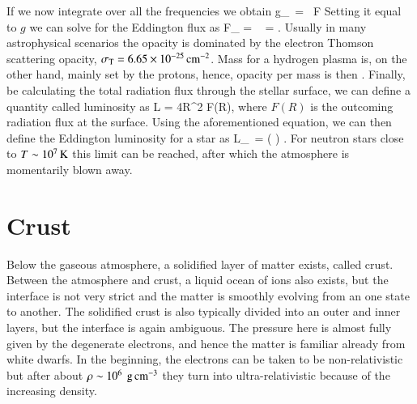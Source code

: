 If we now integrate over all the frequencies we obtain
\be
g_{} =  \kappa F
\ee
Setting it equal to $g$ we can solve for the Eddington flux as
\be
F_{} =   =  .
\ee
Usually in many astrophysical scenarios the opacity is dominated by the electron Thomson scattering opacity, $\sigma_{\mathrm{T}} = 6.65 \times 10^{-25} \, \mathrm{cm}^{-2}$.
Mass for a hydrogen plasma is, on the other hand, mainly set by the protons, hence, opacity per mass is then
\be
\kappa \approx {}.
\ee
Finally, be calculating the total radiation flux through the stellar surface, we can define a quantity called luminosity as
\be
L = 4\pi R^2 F(R),
\ee
where $F(R)$ is the outcoming radiation flux at the surface.
Using the aforementioned equation, we can then define the Eddington luminosity for a star as 
\be
L_{} =  \approx {} \left(  \right) \ergs.
\ee
For neutron stars close to $T \sim 10^7 \, \mathrm{K}$ this limit can be reached, after which the atmosphere is momentarily blown away.




\section{Crust}

Below the gaseous atmosphere, a solidified layer of matter exists, called crust.
Between the atmosphere and crust, a liquid ocean of ions also exists, but the interface is not very strict and the matter is smoothly evolving from an one state to another.
The solidified crust is also typically divided into an outer and inner layers, but the interface is again ambiguous. 
The pressure here is almost fully given by the degenerate electrons, and hence the matter is familiar already from white dwarfs.
In the beginning, the electrons can be taken to be non-relativistic but after about $\rho \sim 10^{6} \gcm$ they turn into ultra-relativistic because of the increasing density.

